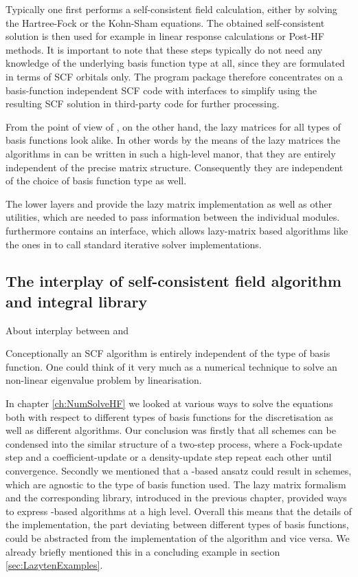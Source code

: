 Typically one first performs a self-consistent field calculation,
either by solving the Hartree-Fock or the Kohn-Sham equations.
The obtained self-consistent solution is then used for example in
linear response calculations or Post-HF methods.
It is important to note that these steps
typically do not need any knowledge of the underlying basis function type
at all, since they are formulated in terms of SCF orbitals only.
The \molsturm program package therefore concentrates
on a basis-function independent SCF code
with interfaces to simplify using the resulting SCF solution
in third-party code for further processing.

From the point of view of \gscf,
on the other hand,
the lazy matrices for all types of basis functions look alike.
In other words by the means of the lazy matrices
the algorithms in \gscf
can be written in such a high-level manor,
that they are entirely independent of the precise matrix structure.
Consequently they are independent of the choice of basis function type as well.

The lower layers \lazyten and \krims provide
the lazy matrix implementation as well as other utilities,
which are needed to pass information between the individual modules.
\lazyten furthermore contains an interface,
which allows lazy-matrix based algorithms like the ones in \gscf to
call standard iterative solver implementations.


\subsection{The interplay of self-consistent field algorithm and integral library}
About interplay between \gint and \gscf

Conceptionally an SCF algorithm is entirely independent of the type of basis function.
One could think of it very much as a numerical technique to solve
an non-linear eigenvalue problem by linearisation.

In chapter \vref{ch:NumSolveHF} we looked at various ways to solve the
\HF equations both with respect to different types of basis functions
for the discretisation as well as different \SCF algorithms.
Our conclusion was firstly that all \SCF schemes can be
condensed into the similar structure of a two-step process,
where a Fock-update step and a coefficient-update or a density-update step
repeat each other until convergence.
Secondly we mentioned that a \contraction-based ansatz could result in \SCF schemes,
which are agnostic to the type of basis function used.
The lazy matrix formalism and the corresponding \lazyten library,
introduced in the previous chapter,
provided ways to express \contraction-based algorithms at a high level.
Overall this means that the details of the \contraction implementation,
\ie the part deviating between different types of basis functions,
could be abstracted from the implementation of the \SCF algorithm
and vice versa.
We already briefly mentioned this in a concluding example
in section \vref{sec:LazytenExamples}.

